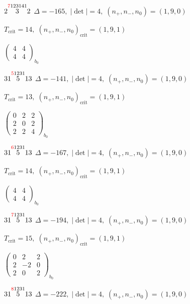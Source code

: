 \documentclass[10pt]{article}
\begin{document}
$2\overset{\textcolor{red}{7}123141}{3}2$ \quad $\Delta=-165,\; |\det|=4,\; (n_+,n_-,n_0)=(1,9,0)$

\hspace{1em}$T_{\text{crit}}=14,\; (n_+,n_-,n_0)_{\text{crit}}=(1,9,1)$

\hspace{2em}$\left(\begin{smallmatrix}4 & 4 \\ 4 & 4\end{smallmatrix}\right)_{\!b_0}$

\smallskip

$31\overset{\textcolor{red}{5}1231}{5}13$ \quad $\Delta=-141,\; |\det|=4,\; (n_+,n_-,n_0)=(1,9,0)$

\hspace{1em}$T_{\text{crit}}=13,\; (n_+,n_-,n_0)_{\text{crit}}=(1,9,1)$

\hspace{2em}$\left(\begin{smallmatrix}0 & 2 & 2 \\ 2 & 0 & 2 \\ 2 & 2 & 4\end{smallmatrix}\right)_{\!b_0}$

$31\overset{\textcolor{red}{6}1231}{5}13$ \quad $\Delta=-167,\; |\det|=4,\; (n_+,n_-,n_0)=(1,9,0)$

\hspace{1em}$T_{\text{crit}}=14,\; (n_+,n_-,n_0)_{\text{crit}}=(1,9,1)$

\hspace{2em}$\left(\begin{smallmatrix}4 & 4 \\ 4 & 4\end{smallmatrix}\right)_{\!b_0}$

$31\overset{\textcolor{red}{7}1231}{5}13$ \quad $\Delta=-194,\; |\det|=4,\; (n_+,n_-,n_0)=(1,9,0)$

\hspace{1em}$T_{\text{crit}}=15,\; (n_+,n_-,n_0)_{\text{crit}}=(1,9,1)$

\hspace{2em}$\left(\begin{smallmatrix}0 & 2 & 2 \\ 2 & -2 & 0 \\ 2 & 0 & 2\end{smallmatrix}\right)_{\!b_0}$

$31\overset{\textcolor{red}{8}1231}{5}13$ \quad $\Delta=-222,\; |\det|=4,\; (n_+,n_-,n_0)=(1,9,0)$
\end{document}
